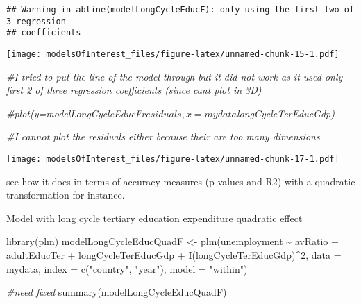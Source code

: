 \documentclass[
]{article}
\newenvironment{Shaded}{\begin{snugshade}}{\end{snugshade}}
\newcommand{\AttributeTok}[1]{\textcolor[rgb]{0.77,0.63,0.00}{#1}}
\newcommand{\CommentTok}[1]{\textcolor[rgb]{0.56,0.35,0.01}{\textit{#1}}}
\newcommand{\DecValTok}[1]{\textcolor[rgb]{0.00,0.00,0.81}{#1}}
\newcommand{\FunctionTok}[1]{\textcolor[rgb]{0.00,0.00,0.00}{#1}}
\newcommand{\NormalTok}[1]{#1}
\newcommand{\OtherTok}[1]{\textcolor[rgb]{0.56,0.35,0.01}{#1}}
\newcommand{\SpecialCharTok}[1]{\textcolor[rgb]{0.00,0.00,0.00}{#1}}
\newcommand{\StringTok}[1]{\textcolor[rgb]{0.31,0.60,0.02}{#1}}
\begin{document}
\begin{verbatim}
## Warning in abline(modelLongCycleEducF): only using the first two of 3 regression
## coefficients
\end{verbatim}

\texttt{[image: modelsOfInterest\_files/figure-latex/unnamed-chunk-15-1.pdf]}

\begin{Shaded}
\begin{Highlighting}[]
\CommentTok{\#I tried to put the line of the model through but it did not work as it used only first 2 of three regression coefficients (since can\textquotesingle{}t plot in 3D)}
\end{Highlighting}
\end{Shaded}

\begin{Shaded}
\begin{Highlighting}[]
\CommentTok{\#plot(y=modelLongCycleEducF$residuals, x=mydata$longCycleTerEducGdp)}

\CommentTok{\#I cannot plot the residuals either because their are too many dimensions}
\end{Highlighting}
\end{Shaded}

\begin{Shaded}
\end{Shaded}

\texttt{[image: modelsOfInterest\_files/figure-latex/unnamed-chunk-17-1.pdf]}

see how it does in terms of accuracy measures (p-values and R2) with a
quadratic transformation for instance.

Model with long cycle tertiary education expenditure quadratic effect

\begin{Shaded}
\begin{Highlighting}[]
\FunctionTok{library}\NormalTok{(plm)}
\NormalTok{modelLongCycleEducQuadF }\OtherTok{\textless{}{-}} \FunctionTok{plm}\NormalTok{(unemployment }\SpecialCharTok{\textasciitilde{}}\NormalTok{  avRatio }\SpecialCharTok{+}\NormalTok{ adultEducTer }\SpecialCharTok{+}\NormalTok{ longCycleTerEducGdp }\SpecialCharTok{+} \FunctionTok{I}\NormalTok{(longCycleTerEducGdp)}\SpecialCharTok{\^{}}\DecValTok{2}\NormalTok{, }\AttributeTok{data =}\NormalTok{ mydata, }\AttributeTok{index =} \FunctionTok{c}\NormalTok{(}\StringTok{"country"}\NormalTok{, }\StringTok{"year"}\NormalTok{), }\AttributeTok{model =} \StringTok{"within"}\NormalTok{)}


\CommentTok{\#need fixed}
\FunctionTok{summary}\NormalTok{(modelLongCycleEducQuadF)}
\end{Highlighting}
\end{Shaded}
\end{document}
